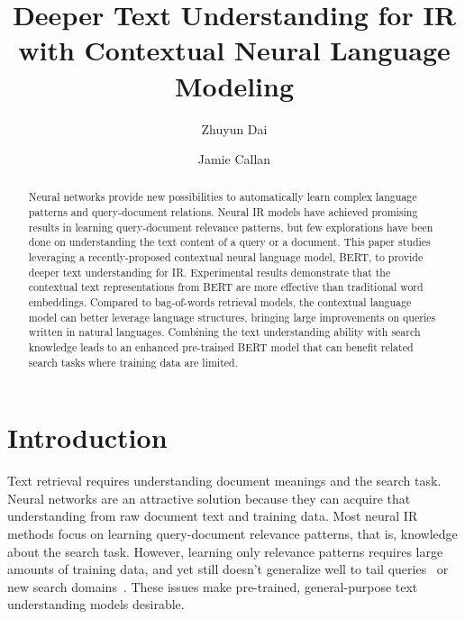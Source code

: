 \documentclass[sigconf]{acmart}
\begin{document}
\title{Deeper Text Understanding for IR with Contextual Neural Language Modeling}


\author{Zhuyun Dai}

\author{Jamie Callan}


\begin{abstract}

\end{abstract}








\begin{abstract}
Neural networks provide new possibilities to automatically learn complex language patterns and query-document relations. Neural IR models have achieved promising results in learning query-document relevance patterns, but few explorations have been done on understanding the text content of a query or a document. This paper studies leveraging a recently-proposed contextual neural language model, BERT, to provide deeper text understanding for IR. Experimental results demonstrate that the contextual text representations from BERT are more effective than traditional word embeddings. Compared to bag-of-words retrieval models, the contextual language model can better leverage language structures, bringing large improvements on queries written in natural languages. Combining the text understanding ability with search knowledge leads to an enhanced pre-trained BERT model that can benefit related search tasks where training data are limited.
\end{abstract}



\maketitle

\section{Introduction}

Text retrieval requires understanding document meanings and the search task.
Neural networks are an attractive solution because they can acquire that understanding from raw document text and training data. Most neural IR methods focus on learning query-document relevance patterns, that is, knowledge about the search task. However, learning only relevance patterns requires large amounts of training data, and yet still doesn't generalize well to tail queries~\cite{K-NRM} or new search domains~\cite{dai2018convolutional}.
These issues make pre-trained, general-purpose text understanding models desirable.
\end{document}
